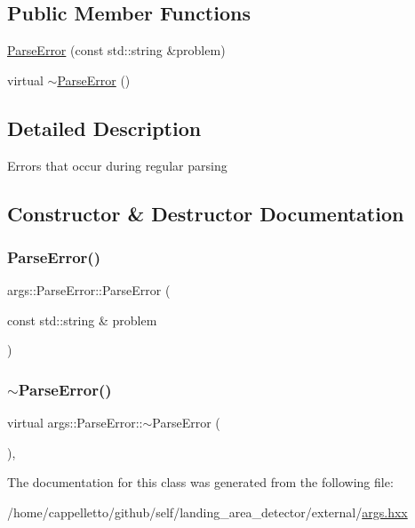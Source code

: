 \subsection*{Public Member Functions}
\begin{DoxyCompactItemize}
\item 
\hyperlink{classargs_1_1_parse_error_a2572276d366705894262de5d8bfd5091}{Parse\+Error} (const std\+::string \&problem)
\item 
virtual \hyperlink{classargs_1_1_parse_error_a8c636a5a068f3fc5bfa3ae5ed17c7a09}{$\sim$\+Parse\+Error} ()
\end{DoxyCompactItemize}


\subsection{Detailed Description}
Errors that occur during regular parsing 

\subsection{Constructor \& Destructor Documentation}
\mbox{\label{classargs_1_1_parse_error_a2572276d366705894262de5d8bfd5091}} 
\subsubsection{\texorpdfstring{Parse\+Error()}{ParseError()}}
{\footnotesize\ttfamily args\+::\+Parse\+Error\+::\+Parse\+Error (\begin{DoxyParamCaption}\item[{const std\+::string \&}]{problem }\end{DoxyParamCaption})\hspace{0.3cm}{\ttfamily [inline]}}

\mbox{\label{classargs_1_1_parse_error_a8c636a5a068f3fc5bfa3ae5ed17c7a09}} 
\subsubsection{\texorpdfstring{$\sim$\+Parse\+Error()}{~ParseError()}}
{\footnotesize\ttfamily virtual args\+::\+Parse\+Error\+::$\sim$\+Parse\+Error (\begin{DoxyParamCaption}{ }\end{DoxyParamCaption})\hspace{0.3cm}{\ttfamily [inline]}, {\ttfamily [virtual]}}



The documentation for this class was generated from the following file\+:\begin{DoxyCompactItemize}
\item 
/home/cappelletto/github/self/landing\+\_\+area\+\_\+detector/external/\hyperlink{args_8hxx}{args.\+hxx}\end{DoxyCompactItemize}
